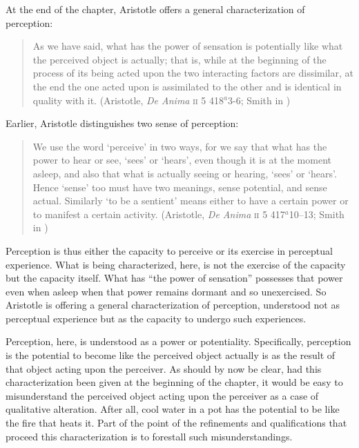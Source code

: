 At the end of the chapter, Aristotle offers a general characterization of perception:
\begin{quote}
	As we have said, what has the power of sensation is potentially like what the perceived object is actually; that is, while at the beginning of the process of its being acted upon the two interacting factors are dissimilar, at the end the one acted upon is assimilated to the other and is identical in quality with it. (Aristotle, \emph{De Anima} \textsc{ii} 5 418\( ^{a} \)3-6; Smith in \citealt[31]{Barnes:1984uq})
\end{quote}
Earlier, Aristotle distinguishes two sense of perception:
\begin{quote}
	We use the word `perceive' in two ways, for we say that what has the power to hear or see, `sees' or `hears', even though it is at the moment asleep, and also that what is actually seeing or hearing, `sees' or `hears'. Hence `sense' too must have two meanings, sense potential, and sense actual. Similarly `to be a sentient' means either to have a certain power or to manifest a certain activity. (Aristotle, \emph{De Anima} \textsc{ii} 5 417\( ^{a} \)10--13; Smith in \citealt[19--30]{Barnes:1984uq})
\end{quote}
Perception is thus either the capacity to perceive or its exercise in perceptual experience. What is being characterized, here, is not the exercise of the capacity but the capacity itself. What has ``the power of sensation'' possesses that power even when asleep when that power remains dormant and so unexercised. So Aristotle is offering a general characterization of perception, understood not as perceptual experience but as the capacity to undergo such experiences. 

Perception, here, is understood as a power or potentiality. Specifically, perception is the potential to become like the perceived object actually is as the result of that object acting upon the perceiver. As should by now be clear, had this characterization been given at the beginning of the chapter, it would be easy to misunderstand the perceived object acting upon the perceiver as a case of qualitative alteration. After all, cool water in a pot has the potential to be like the fire that heats it. Part of the point of the refinements and qualifications that proceed this characterization is to forestall such misunderstandings. 

